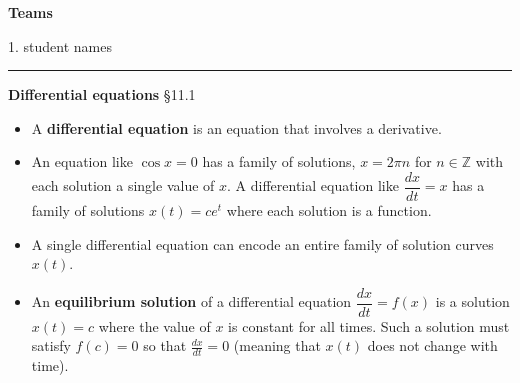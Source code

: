 \documentclass[12pt,letterpaper,noanswers]{exam}
\begin{document}
\noindent\textbf{Teams}

\begin{multicols}{2}

1.  student names
\end{multicols}


\vspace{0.2cm}
\hrule
\vspace{0.2cm}










\noindent\textbf{Differential equations} \S 11.1
\begin{tcolorbox}
\begin{itemize}
\itemsep0em
    \item A \textbf{differential equation} is an equation that involves a derivative.
    \item An equation like $\cos x = 0$ has a family of solutions, $x = 2\pi n$ for $n\in \mathbb{Z}$ with each solution a single value of $x$.  A differential equation like $\dfrac{dx}{dt} = x$ has a family of solutions $x(t) = ce^t$ where each solution is a function.  
    \item A single differential equation can encode an entire family of solution curves $x(t)$.
    \item An \textbf{equilibrium solution} of a differential equation $\dfrac{dx}{dt} = f(x)$ is a solution $x(t) = c$ where the value of $x$ is constant for all times.  Such a solution must satisfy $f(c) = 0$ so that $\frac{dx}{dt} = 0$ (meaning that $x(t)$ does not change with time).
\end{itemize}
\end{tcolorbox}
\end{document}
